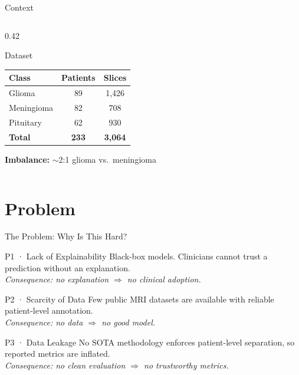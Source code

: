 \documentclass[aspectratio=169]{beamer}
\begin{document}
\begin{frame}{Context}
\begin{columns}
\begin{column}{0.42\textwidth}
\begin{block}{Dataset}
\begin{tabular}{lcc}
          \toprule
          Class & Patients & Slices \\
          \midrule
          \textcolor{myblue}{Glioma}      & 89 & 1{,}426 \\
          \textcolor{mygreen}{Meningioma}  & 82 & \phantom{0}708 \\
          \textcolor{mygold}{Pituitary}   & 62 & \phantom{0}930 \\
          \midrule
          \textbf{Total} & \textbf{233} & \textbf{3{,}064} \\
          \bottomrule
        \end{tabular}
        \vspace{4pt}
        {\scriptsize \textcolor{myred}{\textbf{Imbalance:}}
        $\sim$2:1 glioma vs.\ meningioma}
      \end{block}
    \end{column}
  \end{columns}
\end{frame}

\section{Problem}
\begin{frame}{The Problem: Why Is This Hard?}
  \footnotesize
  {%
  \begin{alertblock}{P1 · Lack of Explainability}
    Black-box models. Clinicians cannot trust a prediction without an explanation.\\[1pt]
    \textcolor{mygreen}{\textit{Consequence: no explanation $\Rightarrow$ no clinical adoption.}}
  \end{alertblock}}
  \vspace{-0.4em}
  {%
  \begin{alertblock}{P2 · Scarcity of Data}
    Few public MRI datasets are available with reliable patient-level annotation.\\[1pt]
    \textcolor{mygreen}{\textit{Consequence: no data $\Rightarrow$ no good model.}}
  \end{alertblock}}
  \vspace{-0.4em}
  {%
  \begin{alertblock}{P3 · Data Leakage}
    No SOTA methodology enforces patient-level separation, so reported metrics are inflated.\\[1pt]
    \textcolor{mygreen}{\textit{Consequence: no clean evaluation $\Rightarrow$ no trustworthy metrics.}}
  \end{alertblock}}
\end{frame}
\end{document}
